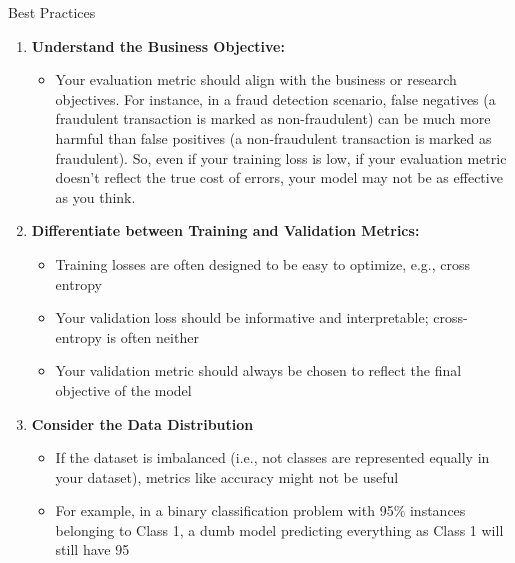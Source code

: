 \documentclass[aspectratio=169]{../latex_main/tntbeamer}  %
\begin{document}
        \begin{frame}[c]{Best Practices}
	    \begin{enumerate}
	        \item \textbf{Understand the Business Objective:}
                \begin{itemize}
                    \item Your evaluation metric should align with the business or research objectives. For instance, in a fraud detection scenario, false negatives (a fraudulent transaction is marked as non-fraudulent) can be much more harmful than false positives (a non-fraudulent transaction is marked as fraudulent). So, even if your training loss is low, if your evaluation metric doesn't reflect the true cost of errors, your model may not be as effective as you think.
                \end{itemize}
                \pause
                \item \textbf{Differentiate between Training and Validation Metrics:}
                \begin{itemize}
                    \item Training losses are often designed to be easy to optimize, e.g., cross entropy
                    \item Your validation loss should be informative and interpretable; cross-entropy is often neither
                    \item Your validation metric should always be chosen to reflect the final objective of the model
                \end{itemize}
                \pause
                \item \textbf{Consider the Data Distribution}
                \begin{itemize}
                    \item If the dataset is imbalanced (i.e., not classes are represented equally in your dataset), metrics like accuracy might not be useful
                    \item For example, in a binary classification problem with 95\% instances belonging to Class 1, a dumb model predicting everything as Class 1 will still have 95%
                \end{itemize}
	    \end{enumerate}

	\end{frame}
\end{document}

